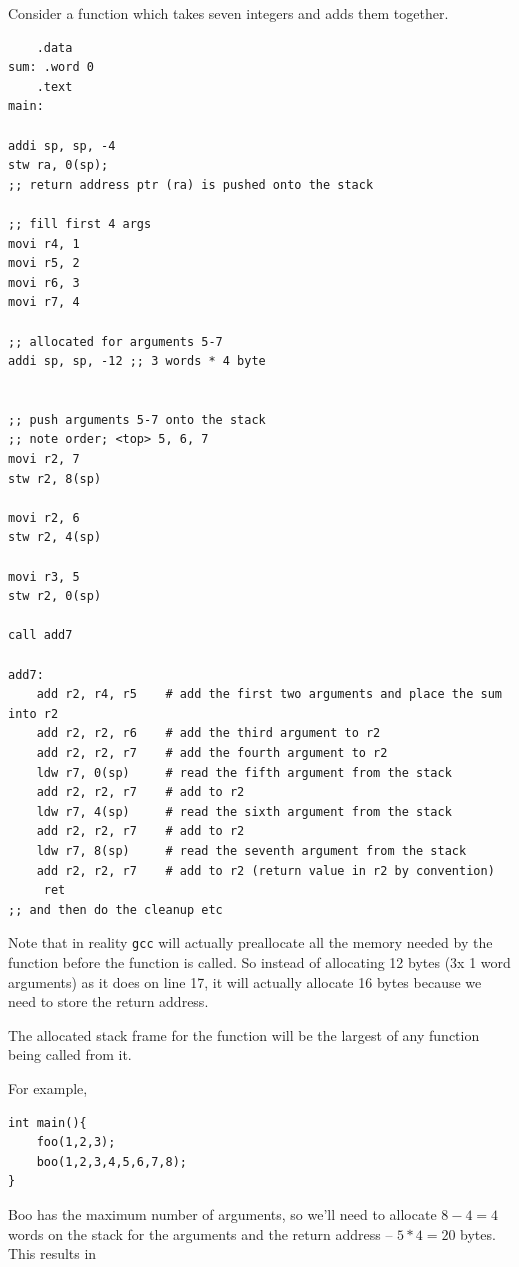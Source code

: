 \documentclass[../notes.tex]{subfiles}
\begin{document}
Consider a function which takes seven integers and adds them together.

\begin{listing}[H]
\begin{verbatim}
	.data
sum: .word 0
	.text
main:

addi sp, sp, -4
stw ra, 0(sp);
;; return address ptr (ra) is pushed onto the stack

;; fill first 4 args
movi r4, 1
movi r5, 2
movi r6, 3
movi r7, 4

;; allocated for arguments 5-7
addi sp, sp, -12 ;; 3 words * 4 byte


;; push arguments 5-7 onto the stack
;; note order; <top> 5, 6, 7
movi r2, 7
stw r2, 8(sp)

movi r2, 6
stw r2, 4(sp)

movi r3, 5
stw r2, 0(sp)

call add7

add7:
	add r2, r4, r5    # add the first two arguments and place the sum into r2
	add r2, r2, r6    # add the third argument to r2
	add r2, r2, r7    # add the fourth argument to r2
	ldw r7, 0(sp)     # read the fifth argument from the stack
	add r2, r2, r7    # add to r2
	ldw r7, 4(sp)     # read the sixth argument from the stack
	add r2, r2, r7    # add to r2
	ldw r7, 8(sp)     # read the seventh argument from the stack
	add r2, r2, r7    # add to r2 (return value in r2 by convention)
	 ret
;; and then do the cleanup etc
\end{verbatim}
\end{listing}

Note that in reality \texttt{gcc}   will actually preallocate all the memory needed by the function before the function is called. So instead of allocating 12 bytes (3x 1 word arguments) as it does on line 17, it will actually allocate 16 bytes because we need to store the return address.

The allocated stack frame for the function will be the largest of any function being called from it.

For example,

\begin{listing}[H]
\begin{verbatim}
int main(){
	foo(1,2,3);
	boo(1,2,3,4,5,6,7,8);
}
\end{verbatim}
\end{listing}

Boo has the maximum number of arguments, so we'll need to allocate $ 8-4=4 $ words on the stack for the arguments and the return address -- $5*4=20$ bytes. This results in
\end{document}
